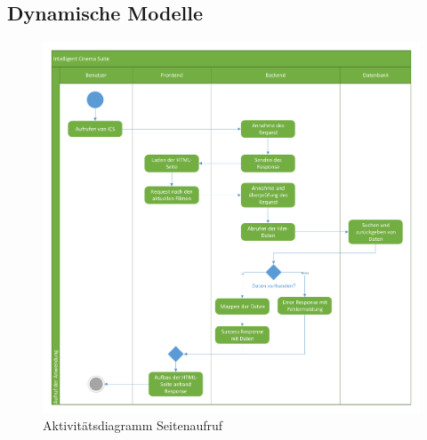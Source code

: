 		\subsection{Dynamische Modelle}
		\begin{figure}[H]
			\centering 
			\includegraphics[width=15cm]{img/adSeitenaufruf.pdf}
			\captionsetup{format=hang}
			\caption[Aktivitätsdiagramm Seitenaufruf]{\label{fig:aktivitätSeitenaufruf} Aktivitätsdiagramm Seitenaufruf}
		\end{figure}
		
